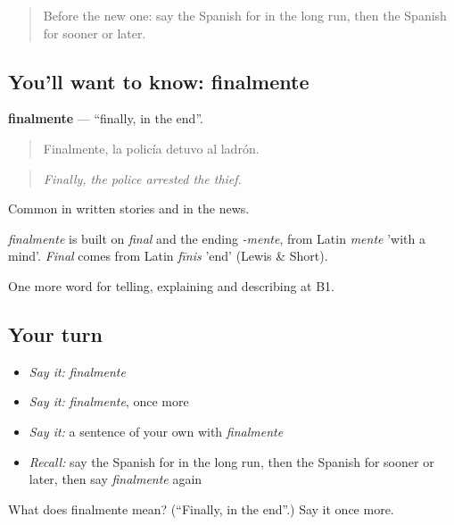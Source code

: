 \begin{quote}
Before the new one: say the Spanish for in the long run, then the Spanish for sooner or later.
\end{quote}

\subsection*{You'll want to know: finalmente}
\textbf{finalmente} — \textquotedblleft{}finally, in the end\textquotedblright{}.

\begin{quote}
Finalmente, la policía detuvo al ladrón.
\end{quote}

\begin{quote}
\emph{Finally, the police arrested the thief.}
\end{quote}

Common in written stories and in the news.

\begin{cousinweb}
\emph{finalmente} is built on \emph{final} and the ending \emph{-mente}, from Latin \emph{mente} 'with a mind'. \emph{Final} comes from Latin \emph{fīnis} 'end' (Lewis \& Short).
\end{cousinweb}

\begin{grammarlens}[title={What you've built}]
One more word for telling, explaining and describing at B1.
\end{grammarlens}

\subsection*{Your turn}
\begin{itemize}
\raggedright
  \item \emph{Say it:} \emph{finalmente}
  \item \emph{Say it:} \emph{finalmente}, once more
  \item \emph{Say it:} a sentence of your own with \emph{finalmente}
  \item \emph{Recall:} say the Spanish for in the long run, then the Spanish for sooner or later, then say \emph{finalmente} again
\end{itemize}

\begin{tcolorbox}[breakable,colback=teal!4,colframe=teal!35!black,title={Before you move on}]
What does finalmente mean? (\textquotedblleft{}Finally, in the end\textquotedblright{}.) Say it once more.
\end{tcolorbox}
